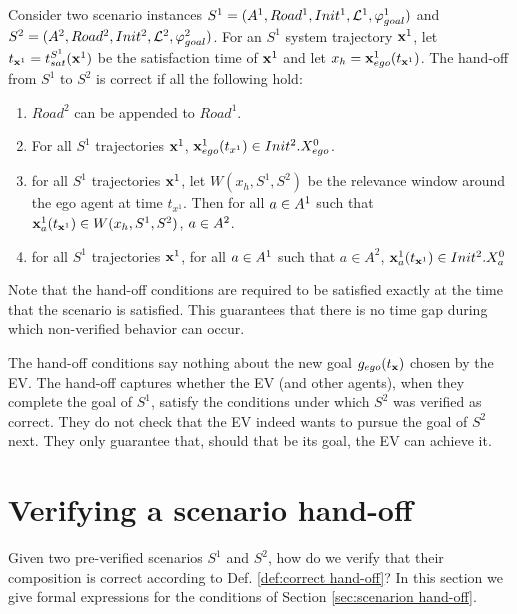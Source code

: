 \begin{defn}
	\label{def:correct hand-off}
Consider two scenario instances $S^1 = (A^1, Road^1, Init^1, \mathcal{L}^1, \varphi_{goal}^1)$
and
$S^2 = (A^2,Road^2, Init^2, \mathcal{L}^2, \varphi_{goal}^2)$.
For an $S^1$ system trajectory $\mathbf{x}^1$, let $t_{\mathbf{x}^1} = t_{sat}^{S^1}(\mathbf{x}^1)$ be the satisfaction time of $\mathbf{x}^1$ and let $x_h = \mathbf{x}^1_{ego}(t_{\mathbf{x}^1})$.
The hand-off from $S^1$ to $S^2$ is correct if all the following hold:
\begin{enumerate}
	\item $Road^2$ can be appended to $Road^1$.
	\label{hand-off:roads}
	\item For all $S^1$ trajectories $\mathbf{x}^1$, $\mathbf{x}^1_{ego}(t_{x^1}) \in Init^2.X_{ego}^0$.
	\label{hand-off:ego initialization}
	\item for all $S^1$ trajectories $\mathbf{x}^1$, let $W(x_h,S^1,S^2)$ be the relevance window around the ego agent at time $t_{x^1}$. Then for all $a \in A^1$ such that $\mathbf{x}^1_a(t_{\mathbf{x}^1}) \in W(x_h,S^1,S^2)$, $a \in A^2$.
	\label{hand-off:agent survival}
	\item for all $S^1$ trajectories $\mathbf{x}^1$, for all $a \in A^1$ such that $a \in A^2$, $\mathbf{x}^1_a(t_{\mathbf{x}^1}) \in Init^2.X_a^0$
	\label{hand-off:initialization}
\end{enumerate}

\end{defn}
Note that the hand-off conditions are required to be satisfied exactly at the time that the scenario is satisfied.
This guarantees that there is no time gap during which non-verified behavior can occur.

The hand-off conditions say nothing about the new goal $g_{ego}(t_{\mathbf{x}})$ chosen by the EV.
The hand-off captures whether the EV (and other agents), when they complete the goal of $S^1$, satisfy the conditions under which $S^2$ was verified as correct. 
They do not check that the EV indeed wants to pursue the goal of $S^2$ next. They only guarantee that, should that be its goal, the EV can achieve it.

\section{Verifying a scenario hand-off}
\label{sec:verifying hand-off}
Given two pre-verified scenarios $S^1$ and $S^2$, how do we verify that their composition is correct according to Def. \ref{def:correct hand-off}?
In this section we give formal expressions for the conditions of Section \ref{sec:scenarion hand-off}.


